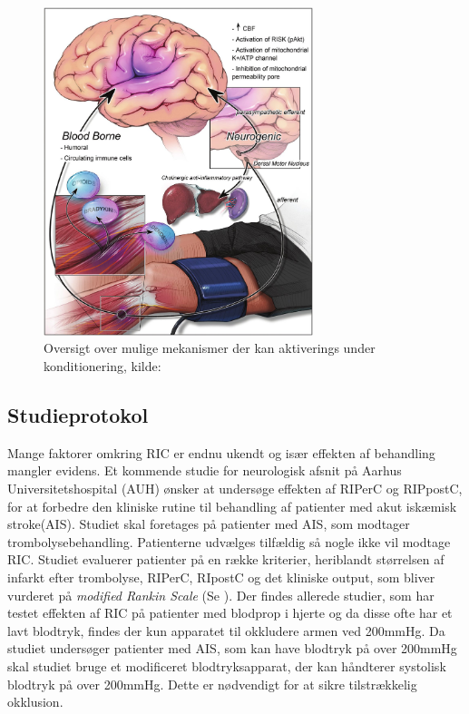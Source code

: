 \begin{figure}[H]
	\centering
	\includegraphics[width = 0.7\textwidth]{billeder/konditioneringsmekanismer.png}
	\caption{Oversigt over mulige mekanismer der kan aktiverings under konditionering, kilde: \cite{RefWorks:3}} \label{fig:mechanism}
\end{figure}

\subsection{Studieprotokol}\label{title:studieprotokold}
Mange faktorer omkring RIC er endnu ukendt og især effekten af behandling mangler evidens. Et kommende studie for neurologisk afsnit på Aarhus Universitetshospital (AUH) ønsker at undersøge effekten af RIPerC og RIPpostC, for at forbedre den kliniske rutine til behandling af patienter med akut iskæmisk stroke(AIS).  Studiet skal foretages på patienter med AIS, som modtager trombolysebehandling. Patienterne udvælges tilfældig så nogle ikke vil modtage RIC. Studiet evaluerer patienter på en række kriterier, heriblandt størrelsen af infarkt efter trombolyse, RIPerC, RIpostC og det kliniske output, som bliver vurderet på \textit{modified Rankin Scale} (Se ). Der findes allerede studier, som har testet effekten af RIC på patienter med blodprop i hjerte og da disse ofte har et lavt blodtryk, findes der kun apparatet til okkludere armen ved 200mmHg. Da studiet undersøger patienter med AIS, som kan have blodtryk på over 200mmHg skal studiet bruge et modificeret blodtryksapparat, der kan håndterer systolisk blodtryk på over 200mmHg. Dette er nødvendigt for at sikre tilstrækkelig okklusion.

